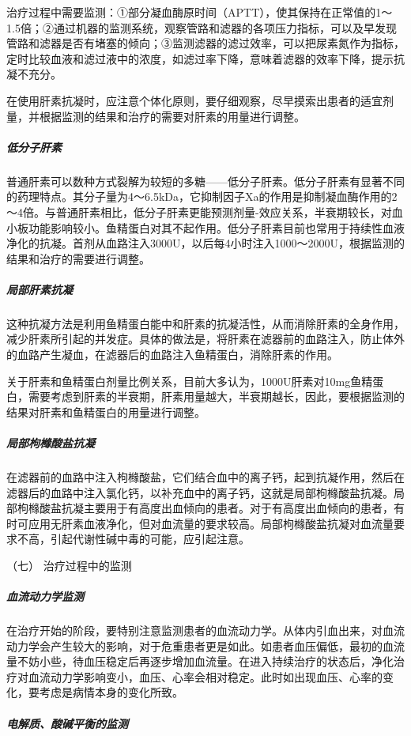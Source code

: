 治疗过程中需要监测：①部分凝血酶原时间（APTT），使其保持在正常值的1～1.5倍；②通过机器的监测系统，观察管路和滤器的各项压力指标，可以及早发现管路和滤器是否有堵塞的倾向；③监测滤器的滤过效率，可以把尿素氮作为指标，定时比较血液和滤过液中的浓度，如滤过率下降，意味着滤器的效率下降，提示抗凝不充分。

在使用肝素抗凝时，应注意个体化原则，要仔细观察，尽早摸索出患者的适宜剂量，并根据监测的结果和治疗的需要对肝素的用量进行调整。

\subparagraph{低分子肝素}

普通肝素可以数种方式裂解为较短的多糖------低分子肝素。低分子肝素有显著不同的药理特点。其分子量为4～6.5kDa，它抑制因子Xa的作用是抑制凝血酶作用的2～4倍。与普通肝素相比，低分子肝素更能预测剂量-效应关系，半衰期较长，对血小板功能影响较小。鱼精蛋白对其不起作用。低分子肝素目前也常用于持续性血液净化的抗凝。首剂从血路注入3000U，以后每4小时注入1000～2000U，根据监测的结果和治疗的需要进行调整。

\subparagraph{局部肝素抗凝}

这种抗凝方法是利用鱼精蛋白能中和肝素的抗凝活性，从而消除肝素的全身作用，减少肝素所引起的并发症。具体的做法是，将肝素在滤器前的血路注入，防止体外的血路产生凝血，在滤器后的血路注入鱼精蛋白，消除肝素的作用。

关于肝素和鱼精蛋白剂量比例关系，目前大多认为，1000U肝素对10mg鱼精蛋白，需要考虑到肝素的半衰期，肝素用量越大，半衰期越长，因此，要根据监测的结果对肝素和鱼精蛋白的用量进行调整。

\subparagraph{局部枸橼酸盐抗凝}

在滤器前的血路中注入枸橼酸盐，它们结合血中的离子钙，起到抗凝作用，然后在滤器后的血路中注入氯化钙，以补充血中的离子钙，这就是局部枸橼酸盐抗凝。局部枸橼酸盐抗凝主要用于有高度出血倾向的患者。对于有高度出血倾向的患者，有时可应用无肝素血液净化，但对血流量的要求较高。局部枸橼酸盐抗凝对血流量要求不高，引起代谢性碱中毒的可能，应引起注意。

\hypertarget{text00391.htmlux5cux23CHP16-10-2-3-7}{}
（七） 治疗过程中的监测

\subparagraph{血流动力学监测}

在治疗开始的阶段，要特别注意监测患者的血流动力学。从体内引血出来，对血流动力学会产生较大的影响，对于危重患者更是如此。如患者血压偏低，最初的血流量不妨小些，待血压稳定后再逐步增加血流量。在进入持续治疗的状态后，净化治疗对血流动力学影响变小，血压、心率会相对稳定。此时如出现血压、心率的变化，要考虑是病情本身的变化所致。

\subparagraph{电解质、酸碱平衡的监测}

